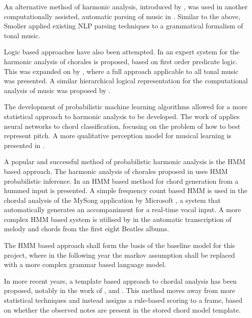\documentclass[bsc,singlespacing,parskip,deptreport,twoside,frontabs]{infthesis}
\begin{document}
An alternative method of harmonic analysis, introduced by \cite{schenker1979harmony}, was used in another computationally assisted, automatic parsing of music in \cite{smoliar1979computer}. Similar to the above, Smolier applied existing NLP parsing techniques to a grammatical formalism of tonal music.

Logic based approaches have also been attempted. In \cite{ebciouglu1990expert} an expert system for the harmonic analysis of chorales is proposed, based on first order predicate logic. This was expanded on by \cite{maxwell1992expert}, where a full approach applicable to all tonal music was presented. A similar hierarchical logical representation for the computational analysis of music was proposed by \cite{smaill1993hierarchical}.

The development of probabilistic machine learning algorithms allowed for a more statistical approach to harmonic analysis to be developed. The work of \cite{laden1989representation} applies neural networks to chord classification, focusing on the problem of how to best represent pitch. A more qualitative perception model for musical learning is presented in \cite{widmer1992qualitative}.

A popular and successful method of probabilistic harmonic analysis is the HMM based approach. The harmonic analysis of chorales proposed in \cite{allan2005harmonising} uses HMM probabilistic inference. In \cite{lee2004ring} an HMM based method for chord generation from a hummed input is presented. A simple frequency count based HMM is used in the chordal analysis of the MySong application by Microsoft \cite[]{mysong}, a system that automatically generates an accompaniment for a real-time vocal input. A more complex HMM based system is utilised by \cite{ryynanen2008automatic} in the automatic transcription of melody and chords from the first eight Beatles albums.

The HMM based approach shall form the basis of the baseline model for this project, where in the following year the markov assumption shall be replaced with a more complex grammar based language model. 

In more recent years, a template based approach to chordal analysis has been proposed, notably in the work of \cite{pardo2002algorithms}, \cite{oudre2009template} and \cite{oudre2011probabilistic}. This method moves away from more statistical techniques and instead assigns a rule-based scoring to a frame, based on whether the observed notes are present in the stored chord model template.
\end{document}

